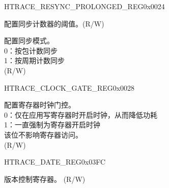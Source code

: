 \begin{register}{H}{TRACE\_RESYNC\_PROLONGED\_REG}{0x0024}\label{regdesc:TRACERESYNCPROLONGEDREG}
%
%
%
\regnewline%
\begin{regdesc}\begin{reglist}
\label{fielddesc:TRACERESYNCPROLONGED}\item [TRACE\_RESYNC\_PROLONGED] 配置同步计数器的阈值。(R/W)
\label{fielddesc:TRACERESYNCMODE}\item [TRACE\_RESYNC\_MODE] 配置同步模式。\\
0：按包计数同步\\
1：按周期计数同步\\ (R/W)
\end{reglist}\end{regdesc}
\end{register}


\begin{register}{H}{TRACE\_CLOCK\_GATE\_REG}{0x0028}\label{regdesc:TRACECLOCKGATEREG}
%
%
\regnewline%
\begin{regdesc}\begin{reglist}
\label{fielddesc:TRACECLKEN}\item [TRACE\_CLK\_EN] 配置寄存器时钟门控。\\
0：仅在应用写寄存器时开启时钟，从而降低功耗\\
1：一直强制为寄存器开启时钟\\
该位不影响寄存器访问。\\ (R/W)
\end{reglist}\end{regdesc}
\end{register}


\begin{register}{H}{TRACE\_DATE\_REG}{0x03FC}\label{regdesc:TRACEDATEREG}
%
%
\regnewline%
\begin{regdesc}\begin{reglist}
\label{fielddesc:TRACEDATE}\item [TRACE\_DATE] 版本控制寄存器。  (R/W)
\end{reglist}\end{regdesc}
\end{register}
